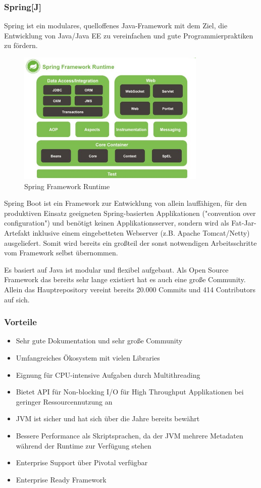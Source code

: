 \subsubsection*{Spring\hfill[J]}
Spring ist ein modulares, quelloffenes Java-Framework mit dem Ziel, die Entwicklung von Java/Java EE zu vereinfachen und gute Programmierpraktiken zu fördern.

\begin{figure}[!h]
\centering
\includegraphics[width=9cm]{images/0x_technology_stack/spring_framework_runtime.png}
\caption{Spring Framework Runtime \cite{springruntime}}
\end{figure}

Spring Boot ist ein Framework zur Entwicklung von allein lauffähigen, für den produktiven Einsatz geeigneten Spring-basierten Applikationen ("convention over configuration") und benötigt keinen Applikationsserver, sondern wird als Fat-Jar-Artefakt inklusive einem eingebetteten Webserver (z.B. Apache Tomcat/Netty) ausgeliefert. Somit wird bereits ein großteil der sonst notwendigen Arbeitsschritte vom Framework selbst übernommen.

Es basiert auf Java ist modular und flexibel aufgebaut. Als Open Source Framework das bereits sehr lange existiert hat es auch eine große Community. Allein das Hauptrepository vereint bereits 20.000 Commits und 414 Contributors auf sich.

\subsubsection*{Vorteile}
\begin{itemize}
    \item Sehr gute Dokumentation und sehr große Community
    \item Umfangreiches Ökosystem mit vielen Libraries
    \item Eignung für CPU-intensive Aufgaben durch Multithreading
    \item Bietet API für Non-blocking I/O für High Throughput Applikationen bei geringer Ressourcennutzung an
    \item JVM ist sicher und hat sich über die Jahre bereits bewährt
    \item Bessere Performance als Skriptsprachen, da der JVM mehrere Metadaten während der Runtime zur Verfügung stehen
    \item Enterprise Support über Pivotal verfügbar
    \item Enterprise Ready Framework
\end{itemize}

